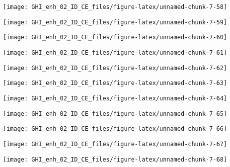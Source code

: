 \documentclass[
  10pt,
  a4paper,oneside]{article}
\begin{document}
\begin{center}\texttt{[image: GHI\_enh\_02\_ID\_CE\_files/figure-latex/unnamed-chunk-7-58]} \end{center}

\begin{center}\texttt{[image: GHI\_enh\_02\_ID\_CE\_files/figure-latex/unnamed-chunk-7-59]} \end{center}

\begin{center}\texttt{[image: GHI\_enh\_02\_ID\_CE\_files/figure-latex/unnamed-chunk-7-60]} \end{center}

\begin{center}\texttt{[image: GHI\_enh\_02\_ID\_CE\_files/figure-latex/unnamed-chunk-7-61]} \end{center}

\begin{center}\texttt{[image: GHI\_enh\_02\_ID\_CE\_files/figure-latex/unnamed-chunk-7-62]} \end{center}

\begin{center}\texttt{[image: GHI\_enh\_02\_ID\_CE\_files/figure-latex/unnamed-chunk-7-63]} \end{center}

\begin{center}\texttt{[image: GHI\_enh\_02\_ID\_CE\_files/figure-latex/unnamed-chunk-7-64]} \end{center}

\begin{center}\texttt{[image: GHI\_enh\_02\_ID\_CE\_files/figure-latex/unnamed-chunk-7-65]} \end{center}

\begin{center}\texttt{[image: GHI\_enh\_02\_ID\_CE\_files/figure-latex/unnamed-chunk-7-66]} \end{center}

\begin{center}\texttt{[image: GHI\_enh\_02\_ID\_CE\_files/figure-latex/unnamed-chunk-7-67]} \end{center}

\begin{center}\texttt{[image: GHI\_enh\_02\_ID\_CE\_files/figure-latex/unnamed-chunk-7-68]} \end{center}
\end{document}
